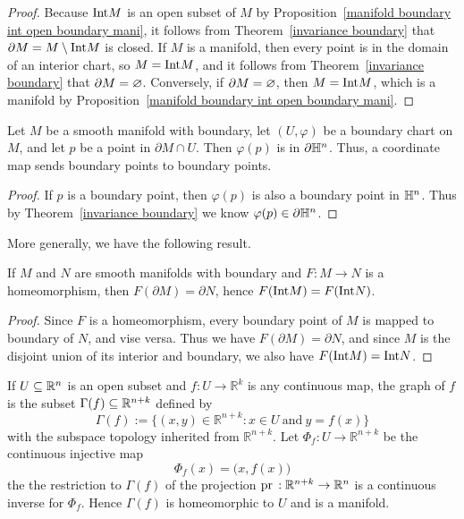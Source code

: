 \begin{proof}
Because $\mathrm{Int} M$ is an open subset of $M$ by Proposition~\ref{manifold boundary int open boundary mani}, it follows from Theorem~\ref{invariance boundary} that $\partial M=M\setminus\mathrm{Int} M$ is closed. If $M$ is a manifold, then every point is in the domain of an interior chart, so $M=\mathrm{Int} M$, and it follows from Theorem~\ref{invariance boundary} that $\partial M=\varnothing$. Conversely, if $\partial M=\varnothing$, then $M=\mathrm{Int} M$, which is a manifold by Proposition~\ref{manifold boundary int open boundary mani}.
\end{proof}
\begin{corollary}
Let $M$ be a smooth manifold with boundary, let $(U,\varphi)$ be a boundary chart
on $M$, and let $p$ be a point in $\partial M\cap U$. Then $\varphi(p)$ is in $\partial\mathbb{H}^n$. Thus, a coordinate map sends boundary points to boundary points.
\end{corollary}
\begin{proof}
If $p$ is a boundary point, then $\varphi(p)$ is also a boundary point in $\mathbb{H}^n$. Thus by Theorem~\ref{invariance boundary} we know $\varphi(p)\in\partial\mathbb{H}^n$.
\end{proof}
More generally, we have the following result.
\begin{theorem}\label{homeomorphism invariance boundary}
If $M$ and $N$ are smooth manifolds with boundary and $F:M\to N$ is a homeomorphism, then $F(\partial M)=\partial N$, hence $F(\mathrm{Int} M)=F(\mathrm{Int} N)$.
\end{theorem}
\begin{proof}
Since $F$ is a homeomorphism, every boundary point of $M$ is mapped to boundary of $N$, and vise versa. Thus we have $F(\partial M)=\partial N$, and since $M$ is the disjoint union of its interior and boundary, we also have $F(\mathrm{Int} M)=\mathrm{Int} N$.
\end{proof}
\begin{example}\label{Graph mani}
If $U\subseteq\mathbb{R}^n$ is an open subset and $f:U\to\mathbb{R}^k$ is any continuous map, the graph of $f$ is the subset $\Gamma(f)\subseteq\mathbb{R}^{n+k}$ defined by
\[\Gamma(f):=\{(x,y)\in\mathbb{R}^{n+k}:x\in U\ \text{and}\ y=f(x)\}\]
with the subspace topology inherited from $\mathbb{R}^{n+k}$. Let $\varPhi_f:U\to\mathbb{R}^{n+k}$ be the continuous injective map
\[\varPhi_f(x)=\big(x,f(x)\big)\]
the the restriction to $\Gamma(f)$ of the projection $\mathrm{pr}\,:\mathbb{R}^{n+k}\to\mathbb{R}^{n}$ is a continuous inverse for $\Phi_f$. Hence $\Gamma(f)$ is homeomorphic to $U$ and is a manifold.
\end{example}
